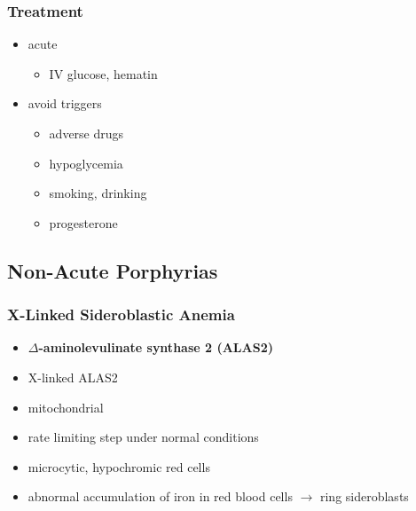 \documentclass[12pt]{scrartcl}
\begin{document}
\subsubsection{Treatment}
\label{sec:orgb2cadd2}
\begin{itemize}
\item acute
\begin{itemize}
\item IV glucose, hematin
\end{itemize}
\item avoid triggers
\begin{itemize}
\item adverse drugs
\item hypoglycemia
\item smoking, drinking
\item progesterone
\end{itemize}
\end{itemize}

\subsection{Non-Acute Porphyrias}
\label{sec:org3cc731e}
\subsubsection{X-Linked Sideroblastic Anemia}
\label{sec:org4c7f5de}
\begin{itemize}
\item \textbf{\(\Delta\)-aminolevulinate synthase 2 (ALAS2)}
\item X-linked ALAS2
\item mitochondrial
\item rate limiting step under normal conditions
\item microcytic, hypochromic red cells
\item abnormal accumulation of iron in red blood cells \(\to\) ring
sideroblasts
\end{itemize}
\end{document}
